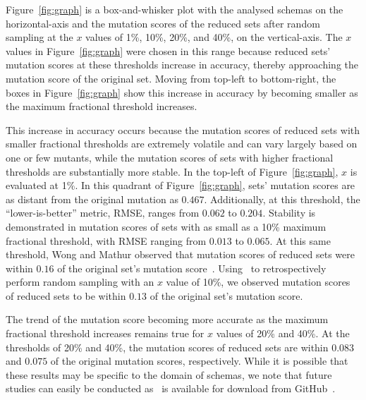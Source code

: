 
Figure~\ref{fig:graph} is a box-and-whisker plot with the analysed schemas on the horizontal-axis and the mutation
scores of the reduced sets after random sampling at the $x$ values of 1\%, 10\%, 20\%, and 40\%, on the vertical-axis.
The $x$ values in Figure~\ref{fig:graph} were chosen in this range because reduced sets' mutation scores at these
thresholds increase in accuracy, thereby approaching the mutation score of the original set. Moving from top-left to
bottom-right, the boxes in Figure~\ref{fig:graph} show this increase in accuracy by becoming smaller as the maximum
fractional threshold increases.

This increase in accuracy occurs because the mutation scores of reduced sets with smaller fractional thresholds are
extremely volatile and can vary largely based on one or few mutants, while the mutation scores of sets with higher
fractional thresholds are substantially more stable. In the top-left of Figure~\ref{fig:graph}, $x$ is evaluated at 1\%.
In this quadrant of Figure~\ref{fig:graph}, sets' mutation scores are as distant from the original mutation as $0.467$.
Additionally, at this threshold, the ``lower-is-better'' metric, RMSE, ranges from $0.062$ to $0.204$.  Stability is
demonstrated in mutation scores of sets with as small as a 10\% maximum fractional threshold, with RMSE ranging from
$0.013$ to $0.065$.  At this same threshold, Wong and Mathur observed that mutation scores of reduced sets were within
$0.16$ of the original set's mutation score~\cite{mathur1994empirical}. Using \mr~to retrospectively perform random
sampling with an $x$ value of 10\%, we observed mutation scores of reduced sets to be within $0.13$ of the original
set's mutation score.

The trend of the mutation score becoming more accurate as the maximum fractional threshold increases remains true for
$x$ values of 20\% and 40\%. At the thresholds of 20\% and 40\%, the mutation scores of reduced sets are within $0.083$
and $0.075$ of the original mutation scores, respectively. While it is possible that these results may be specific to
the domain of schemas, we note that future studies can easily be conducted as \mr~is available for download from
GitHub~\cite{tool}.



